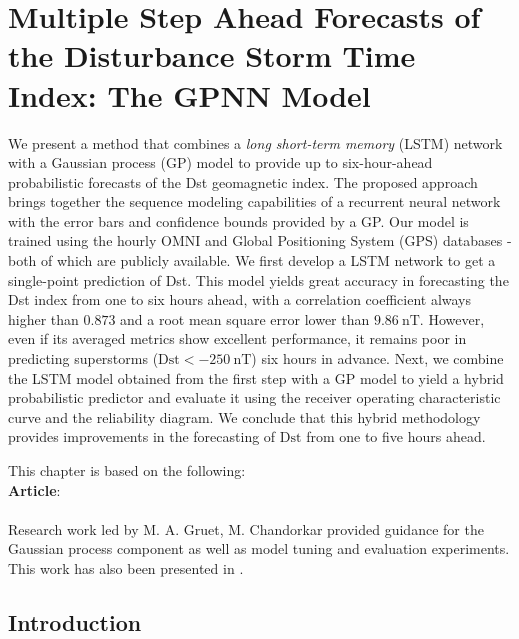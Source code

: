 \chapter{Multiple Step Ahead Forecasts of the Disturbance Storm Time Index: The GPNN Model}\label{chapter:dst_msa}

{\small
	We present a method that combines a \emph{long short-term memory} (LSTM) network with a 
	Gaussian process (GP) model to provide up to six-hour-ahead probabilistic forecasts of the Dst 
	geomagnetic index. The proposed approach brings together the sequence modeling capabilities of 
	a recurrent neural network with the error bars and confidence bounds provided by a GP. Our 
	model is trained using the hourly OMNI and Global Positioning System (GPS) databases - both of 
	which are publicly available. We first develop a LSTM network to get a single-point prediction 
	of Dst. This model yields great accuracy in forecasting the Dst index from one to six hours 
	ahead, with a correlation coefficient always higher than $0.873$ and a root mean square error 
	lower than $\SI{9.86}{\nano\tesla}$. However, even if its averaged metrics show excellent 
	performance, it remains poor in predicting superstorms 
	($\mathrm{Dst} < \SI{-250}{\nano\tesla}$) six hours in advance. Next, we combine the LSTM model 
	obtained from the first step with a GP model to yield a hybrid probabilistic predictor and 
	evaluate it using the receiver operating characteristic curve and the reliability diagram. We 
	conclude that this hybrid methodology provides improvements in the forecasting of 
	$\mathrm{Dst}$ from one to five hours ahead.

}
	

\vfill
{}
\vfill

\noindent
	\parbox{\textwidth}{%
		{\small This chapter is based on the following:\\

		\textbf{Article}:\\
		 \\
		Research work led by M. A. Gruet, M. Chandorkar provided guidance for 
		the Gaussian process component as well as model tuning and evaluation 
		experiments. This work has also been presented in 
		\citet[ch.~5]{gruet2018intelligence}.
		}
    }%

\clearpage

\section{Introduction}

